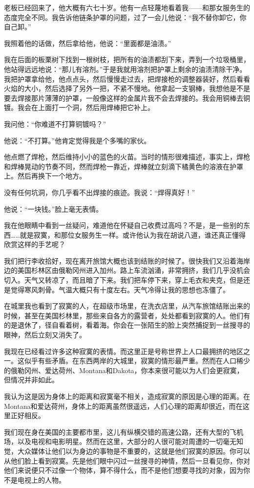 \documentclass[UTF8]{article}
\begin{document}
\par 老板已经回来了，他大概有六七十岁。他有一点轻蔑地看着我——和那女服务生的态度完全不同。我告诉他链条护罩的问题，过了一会儿他说：“我不替你卸它，你自己卸。”
\par 我照着他的话做，然后拿给他，他说：“里面都是油渍。”
\par 我在后面的板栗树下找到一根树枝，把所有的油渍都刮下来，弄到一个垃圾桶里，他站得远远地说：“那儿有溶剂。”于是我就用溶剂把护罩上剩余的油渍清除干净。我把护罩拿给他，他点点头，然后慢慢走过去，把焊接枪的调整器装好，然后看看火焰的大小，然后选择了另外一把，不紧不慢地。他拿起一支钢棒，我想他是不是要去焊接那片薄薄的护罩，一般像这样的金属片我不会去焊接的。我会用铜棒去铜镀。我会在上面打一个洞，然后用焊棒把它补上。
\par 我问他：“你难道不打算铜镀吗？”
\par 他说：“不打算。”他肯定觉得我是个多嘴的家伙。
\par 他点燃了焊枪，然后维持小小的蓝色的火苗。当时的情形很难描述，事实上，焊枪和焊棒晃动的节奏不同，然而焊枪一靠近，焊棒就立刻滴下橘黄色的溶液在护罩上。然后再换下一个地方。
\par 没有任何坑洞，你几乎看不出焊接的痕迹。我说：“焊得真好！”
\par 他说：“一块钱。”脸上毫无表情。
\par 我在他眼睛中看到一丝疑问，难道他在怀疑自己收费过高吗？不是，是一些别的东西……就是寂寞，和那位女服务生一样。或许他认为我在胡说八道，谁还真正懂得欣赏这样的手艺呢？
\par 我们把行李收拾好，现在离开旅馆大概也该到结账的时候了。很快我们又沿着海岸边的美国杉林区由俄勒冈州进入加州。路上车流汹涌，非常拥挤，我们几乎没机会切入。天气又转凉了，而且暗了下来。我们把车停下来，穿上毛衣和夹克，但是还是觉得寒风刺骨。气温大概只有十度左右。天气冷得让我的思想也冻僵了。
\par 在城里我也看到了寂寞的人，在超级市场里，在洗衣店里，从汽车旅馆结账出来的时候，甚至在美国杉林里，那些来自各方的露营者，处处都看到寂寞的人。他们有的是退休了，径自看着树，看着海。你会在一张陌生的脸上突然捕捉到一丝搜寻的眼神，然后立刻又消失了。
\par 我现在已经看过许多这种寂寞的表情。而这里正是号称世界上人口最拥挤的地区之一。这似乎有些矛盾。在东西两岸的大城里，寂寞的情形最严重。然而在人口稀少的俄勒冈州、爱达荷州、Montana和Dakota，你本来很可能以为人们会更寂寞，但情况并非如此。
\par 我认为这是因为身体上的距离和寂寞毫不相关，造成寂寞的原因是心理的距离。在Montana和爱达荷州，身体上的距离虽然很遥远，人们心理的距离却很近，而在这里正好相反。
\par 我们现在身在美国的主要都市里，这儿有纵横交错的高速公路，还有大型的飞机场，以及电视和电影明星。然而在这里，大部分的人很可能对周遭的一切毫无知觉，大众媒体让他们以为身边的事物是不重要的，这就是他们寂寞的原因。你可以从他们脸上看到寂寞。先是他们眼中闪过一丝搜寻的神情，然后一旦看见你，你对他们来说便只不过像一个物体，算不得什么，而不是他们想要寻找的对象，因为你不是电视上的人物。
\end{document}
